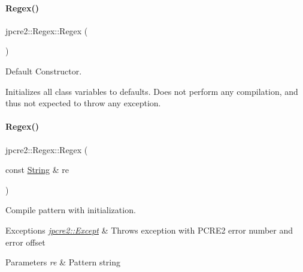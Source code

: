 \paragraph{\texorpdfstring{Regex()}{Regex()}\hspace{0.1cm}{\footnotesize\ttfamily [1/6]}}
{\footnotesize\ttfamily jpcre2\+::\+Regex\+::\+Regex (\begin{DoxyParamCaption}{ }\end{DoxyParamCaption})\hspace{0.3cm}{\ttfamily [inline]}}



Default Constructor. 

Initializes all class variables to defaults. Does not perform any compilation, and thus not expected to throw any exception. \hypertarget{classjpcre2_1_1Regex_a4d959fdc32791bee6d819abfc44af51a_a4d959fdc32791bee6d819abfc44af51a}{}\label{classjpcre2_1_1Regex_a4d959fdc32791bee6d819abfc44af51a_a4d959fdc32791bee6d819abfc44af51a} 
\paragraph{\texorpdfstring{Regex()}{Regex()}\hspace{0.1cm}{\footnotesize\ttfamily [2/6]}}
{\footnotesize\ttfamily jpcre2\+::\+Regex\+::\+Regex (\begin{DoxyParamCaption}\item[{const \hyperlink{namespacejpcre2_a91f03070152fb228bc116c5a737f1d16}{String} \&}]{re }\end{DoxyParamCaption})\hspace{0.3cm}{\ttfamily [inline]}}



Compile pattern with initialization. 


\begin{DoxyExceptions}{Exceptions}
{\em \hyperlink{classjpcre2_1_1Except}{jpcre2\+::\+Except}} & Throws exception with P\+C\+R\+E2 error number and error offset \\
\hline
\end{DoxyExceptions}

\begin{DoxyParams}{Parameters}
{\em re} & Pattern string \\
\hline
\end{DoxyParams}
\hypertarget{classjpcre2_1_1Regex_a58be9b4e1eaec2a43586af45c6ae5549_a58be9b4e1eaec2a43586af45c6ae5549}{}\label{classjpcre2_1_1Regex_a58be9b4e1eaec2a43586af45c6ae5549_a58be9b4e1eaec2a43586af45c6ae5549} 
